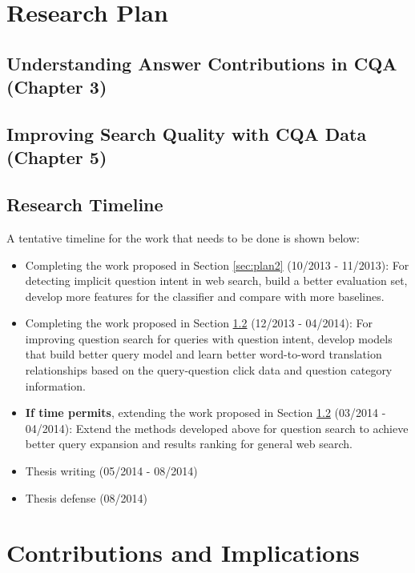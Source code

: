 \section{Research Plan}


\subsection{Understanding Answer Contributions in CQA (Chapter 3)}
\label{sec:plan1}


\subsection{Improving Search Quality with CQA Data (Chapter 5)}
\label{sec:plan3}


\subsection{Research Timeline}

\noindent A tentative timeline for the work that needs to be done is shown below:

\begin{itemize}
\item Completing the work proposed in Section \ref{sec:plan2} (10/2013 - 11/2013): For detecting implicit question intent in web search, build a better evaluation set, develop more features for the classifier and compare with more baselines.
\item Completing the work proposed in Section \ref{sec:plan3} (12/2013 - 04/2014): For improving question search for queries with question intent, develop models that build better query model and learn better word-to-word translation relationships based on the query-question click data and question category information.
\item \textbf{If time permits}, extending the work proposed in Section \ref{sec:plan3} (03/2014 - 04/2014): Extend the methods developed above for question search to achieve better query expansion and results ranking for general web search.
\item Thesis writing (05/2014 - 08/2014) 
\item Thesis defense (08/2014)
\end{itemize}


\section{Contributions and Implications}



